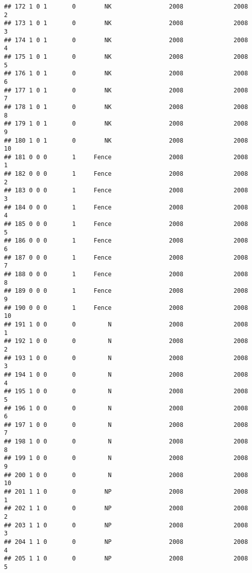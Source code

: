 \documentclass[]{article}
\begin{document}
\begin{verbatim}
## 172 1 0 1       0        NK                2008              2008        2
## 173 1 0 1       0        NK                2008              2008        3
## 174 1 0 1       0        NK                2008              2008        4
## 175 1 0 1       0        NK                2008              2008        5
## 176 1 0 1       0        NK                2008              2008        6
## 177 1 0 1       0        NK                2008              2008        7
## 178 1 0 1       0        NK                2008              2008        8
## 179 1 0 1       0        NK                2008              2008        9
## 180 1 0 1       0        NK                2008              2008       10
## 181 0 0 0       1     Fence                2008              2008        1
## 182 0 0 0       1     Fence                2008              2008        2
## 183 0 0 0       1     Fence                2008              2008        3
## 184 0 0 0       1     Fence                2008              2008        4
## 185 0 0 0       1     Fence                2008              2008        5
## 186 0 0 0       1     Fence                2008              2008        6
## 187 0 0 0       1     Fence                2008              2008        7
## 188 0 0 0       1     Fence                2008              2008        8
## 189 0 0 0       1     Fence                2008              2008        9
## 190 0 0 0       1     Fence                2008              2008       10
## 191 1 0 0       0         N                2008              2008        1
## 192 1 0 0       0         N                2008              2008        2
## 193 1 0 0       0         N                2008              2008        3
## 194 1 0 0       0         N                2008              2008        4
## 195 1 0 0       0         N                2008              2008        5
## 196 1 0 0       0         N                2008              2008        6
## 197 1 0 0       0         N                2008              2008        7
## 198 1 0 0       0         N                2008              2008        8
## 199 1 0 0       0         N                2008              2008        9
## 200 1 0 0       0         N                2008              2008       10
## 201 1 1 0       0        NP                2008              2008        1
## 202 1 1 0       0        NP                2008              2008        2
## 203 1 1 0       0        NP                2008              2008        3
## 204 1 1 0       0        NP                2008              2008        4
## 205 1 1 0       0        NP                2008              2008        5

\end{verbatim}
\end{document}
